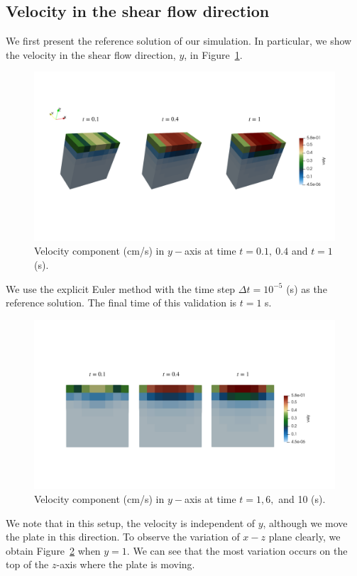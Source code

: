 \subsection{Velocity in the shear flow direction}
 We first present the reference solution of our simulation. In particular, we show the velocity in the shear flow direction, $y$, in Figure~\ref{fig_reference_3d_T110}.
\begin{figure}[ht]
\begin{center}
  \includegraphics[scale=0.23]{figures/fig_reference_3d_T110.pdf}
  \end{center}
\caption{Velocity component (cm/s) in $y-$axis at time $t = 0.1, \ 0.4$ and $t = 1$ (s).}
\label{fig_reference_3d_T110}
\end{figure}
We use the explicit Euler method with the time step $\Delta t = 10^{-5}$ (s) as the reference solution. The final time of this validation is $t = 1$ s.
\begin{figure}[ht]
  \begin{center}
    \includegraphics[scale=0.25]{figures/fig_reference_T1610.pdf}
    \end{center}
  \caption{Velocity component (cm/s) in $y-$axis at time $t = 1, 6,$ and 10 (s).}
  \label{fig_rerference_T1}
\end{figure}
\par
We note that in this setup, the velocity is independent of $y$, although we move the plate in this direction. To observe the variation of $x-z$ plane clearly, we obtain Figure~\ref{fig_rerference_T1} when $y = 1$. We can see that the most variation occurs on the top of the $z$-axis where the plate is moving. 

